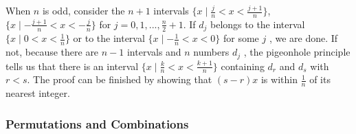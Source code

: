 \documentclass{../../cls/sig-alternate-05-2015}
\begin{document}
\begin{enumerate}
	When $n$ is odd, consider the $n + 1$ intervals $\{x \mid \frac{j}{n} < x < \frac{j + 1}{n}\}$, $\{x \mid -\frac{j + 1}{n} < x < -\frac{j}{n}\}$ for $j = 0, 1, . . . , \frac{n}{2} + 1$. If $d_j$ belongs to the interval $\{x \mid 0 < x < \frac{1}{n}\}$ or to the interval $\{x \mid -\frac{1}{n} < x < 0\}$ for some $j$ , we are done. If not, because there are $n - 1$ intervals	and $n$ numbers $d_j$ , the pigeonhole principle tells us that there is an interval $\{x \mid \frac{k}{n} < x < \frac{k + 1}{n}\}$ containing $d_r$ and $d_s$ with $r < s$. The proof can be finished by showing that $(s - r)x$ is within $\frac{1}{n}$ of its nearest integer.
\end{enumerate}
\subsubsection{Permutations and Combinations}
\end{document}

